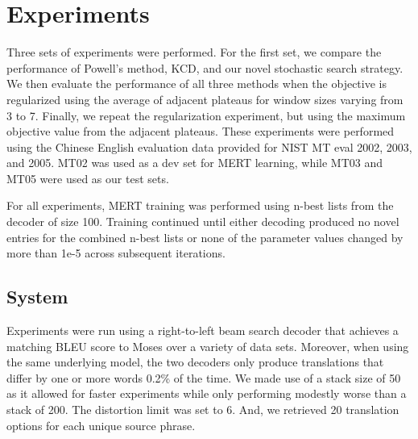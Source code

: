 \documentclass[11pt]{article}
\begin{document}

\section{Experiments}

Three sets of experiments were performed. For the first set, we compare the performance of Powell's method, KCD, and our novel stochastic search strategy. We then evaluate the performance of all three methods when the objective is regularized using the average of adjacent plateaus for window sizes varying from 3 to 7. Finally, we repeat the regularization experiment, but using the maximum objective value from the adjacent plateaus. These experiments were performed using the Chinese English evaluation data provided for NIST MT eval 2002, 2003, and 2005. MT02 was used as a dev set for MERT learning, while MT03 and MT05 were used as our test sets. 

For all experiments, MERT training was performed using n-best lists from the decoder of size 100. Training continued until either decoding produced no novel entries for the combined n-best lists or none of the parameter values changed by more than 1e-5 across subsequent iterations.

\subsection{System}

Experiments were run using a right-to-left beam search decoder that achieves a matching BLEU score to Moses \cite{koehn2007} over a variety of data sets. Moreover, when using the same underlying model, the two decoders only produce translations that differ by one or more words 0.2\% of the time. We made use of a stack size of 50 as it allowed for faster experiments while only performing modestly worse than a stack of 200. The distortion limit was set to 6. And, we retrieved 20 translation options for each unique source phrase.
\end{document}
